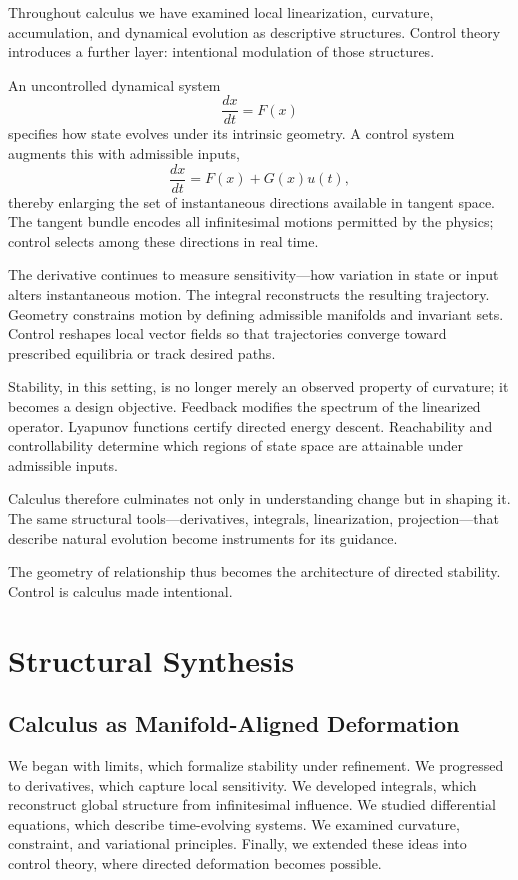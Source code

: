 \documentclass[12pt]{book}
\begin{document}
Throughout calculus we have examined local linearization, curvature,
accumulation, and dynamical evolution as descriptive structures.
Control theory introduces a further layer: intentional modulation of
those structures.

An uncontrolled dynamical system
\[
\frac{dx}{dt} = F(x)
\]
specifies how state evolves under its intrinsic geometry. A control
system augments this with admissible inputs,
\[
\frac{dx}{dt} = F(x) + G(x)u(t),
\]
thereby enlarging the set of instantaneous directions available in
tangent space. The tangent bundle encodes all infinitesimal motions
permitted by the physics; control selects among these directions in
real time.

The derivative continues to measure sensitivity---how variation in
state or input alters instantaneous motion. The integral reconstructs
the resulting trajectory. Geometry constrains motion by defining
admissible manifolds and invariant sets. Control reshapes local
vector fields so that trajectories converge toward prescribed
equilibria or track desired paths.

Stability, in this setting, is no longer merely an observed property
of curvature; it becomes a design objective. Feedback modifies the
spectrum of the linearized operator. Lyapunov functions certify
directed energy descent. Reachability and controllability determine
which regions of state space are attainable under admissible inputs.

Calculus therefore culminates not only in understanding change but in
shaping it. The same structural tools---derivatives, integrals,
linearization, projection---that describe natural evolution become
instruments for its guidance.

The geometry of relationship thus becomes the architecture of directed
stability. Control is calculus made intentional.

\chapter{Structural Synthesis}

\section{Calculus as Manifold-Aligned Deformation}

We began with limits, which formalize stability under refinement. We progressed to derivatives, which capture local sensitivity. We developed integrals, which reconstruct global structure from infinitesimal influence. We studied differential equations, which describe time-evolving systems. We examined curvature, constraint, and variational principles. Finally, we extended these ideas into control theory, where directed deformation becomes possible.
\end{document}
